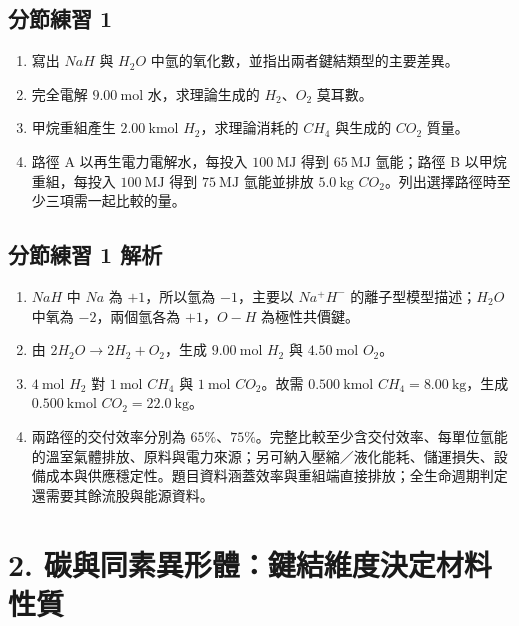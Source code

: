 \documentclass[11pt,a4paper]{article}
\providecommand{\tightlist}{%
  \setlength{\itemsep}{0pt}\setlength{\parskip}{0pt}}
\begin{document}
\subsection{分節練習 1}\label{ux5206ux7bc0ux7df4ux7fd2-1}

\begin{enumerate}
\def\labelenumi{\arabic{enumi}.}
\tightlist
\item
  寫出 \(NaH\) 與 \(H_2O\) 中氫的氧化數，並指出兩者鍵結類型的主要差異。
\item
  完全電解 \(9.00\ \mathrm{mol}\) 水，求理論生成的 \(H_2\)、\(O_2\) 莫耳數。
\item
  甲烷重組產生 \(2.00\ \mathrm{kmol}\) \(H_2\)，求理論消耗的 \(CH_4\) 與生成的 \(CO_2\) 質量。
\item
  路徑 A 以再生電力電解水，每投入 \(100\ \mathrm{MJ}\) 得到 \(65\ \mathrm{MJ}\) 氫能；路徑 B 以甲烷重組，每投入 \(100\ \mathrm{MJ}\) 得到 \(75\ \mathrm{MJ}\) 氫能並排放 \(5.0\ \mathrm{kg}\) \(CO_2\)。列出選擇路徑時至少三項需一起比較的量。
\end{enumerate}

\subsection{分節練習 1 解析}\label{ux5206ux7bc0ux7df4ux7fd2-1-ux89e3ux6790}

\begin{enumerate}
\def\labelenumi{\arabic{enumi}.}
\tightlist
\item
  \(NaH\) 中 \(Na\) 為 \(+1\)，所以氫為 \(-1\)，主要以 \(Na^+H^-\) 的離子型模型描述；\(H_2O\) 中氧為 \(-2\)，兩個氫各為 \(+1\)，\(O-H\) 為極性共價鍵。
\item
  由 \(2H_2O\rightarrow2H_2+O_2\)，生成 \(9.00\ \mathrm{mol}\) \(H_2\) 與 \(4.50\ \mathrm{mol}\) \(O_2\)。
\item
  \(4\ \mathrm{mol}\) \(H_2\) 對 \(1\ \mathrm{mol}\) \(CH_4\) 與 \(1\ \mathrm{mol}\) \(CO_2\)。故需 \(0.500\ \mathrm{kmol}\) \(CH_4=8.00\ \mathrm{kg}\)，生成 \(0.500\ \mathrm{kmol}\) \(CO_2=22.0\ \mathrm{kg}\)。
\item
  兩路徑的交付效率分別為 \(65\%\)、\(75\%\)。完整比較至少含交付效率、每單位氫能的溫室氣體排放、原料與電力來源；另可納入壓縮／液化能耗、儲運損失、設備成本與供應穩定性。題目資料涵蓋效率與重組端直接排放；全生命週期判定還需要其餘流股與能源資料。
\end{enumerate}

\section{2. 碳與同素異形體：鍵結維度決定材料性質}\label{ux78b3ux8207ux540cux7d20ux7570ux5f62ux9ad4ux9375ux7d50ux7dadux5ea6ux6c7aux5b9aux6750ux6599ux6027ux8cea}
\end{document}
